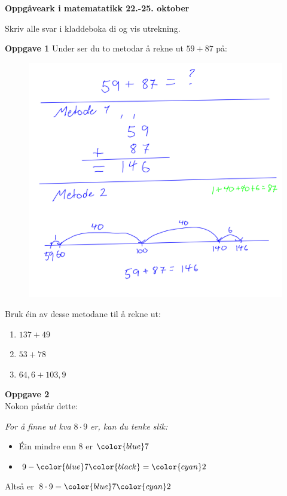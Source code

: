

\geometry{verbose,a4paper, inner=2.05cm, outer=2.05 cm, bmargin=2cm, tmargin=1.8cm}


\begin{huge}
	\textbf{Oppgåveark i matematatikk 22.-25. oktober}\vsk
\end{huge}

Skriv alle svar i kladdeboka di og vis utrekning.\vsk

\textbf{Oppgave 1}\bs
Under ser du to metodar å rekne ut $ 59+87 $ på:
\begin{figure}
	\centering
	\includegraphics[scale=0.5]{plus}
\end{figure}
Bruk éin av desse metodane til å rekne ut:
\begin{enumerate}
	\item $ 137+49 $ \\
	\item $ 53+78 $ \\
	\item $ 64,6+103,9 $
\end{enumerate}
\vsk
\textbf{Oppgave 2}\\
Nokon påstår dette:\vsk
\begin{center}
	\begin{minipage}[c]{0.8\linewidth}
		\itshape
		\textit{For å finne ut kva $8\cdot9  $ er, kan du tenke slik:}
		\begin{itemize}
			\item Éin mindre enn $ 8 $ er $\color{blue} 7 $
			\item $ 9-\color{blue}7\color{black} =\color{cyan}2$
		\end{itemize}
		Altså er $ 8\cdot9=\color{blue}7\color{cyan}2 $
	\end{minipage}
\end{center}
